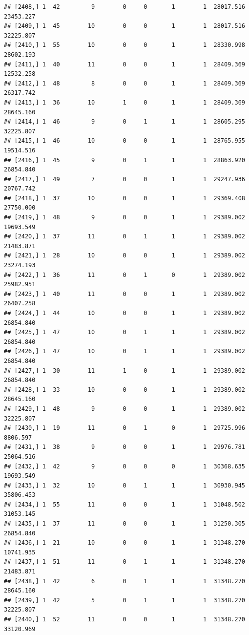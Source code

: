 \documentclass[
]{article}
\begin{document}
\begin{verbatim}
## [2408,] 1  42         9        0     0       1        1  28017.516  23453.227
## [2409,] 1  45        10        0     0       1        1  28017.516  32225.807
## [2410,] 1  55        10        0     0       1        1  28330.998  28602.193
## [2411,] 1  40        11        0     0       1        1  28409.369  12532.258
## [2412,] 1  48         8        0     0       1        1  28409.369  26317.742
## [2413,] 1  36        10        1     0       1        1  28409.369  28645.160
## [2414,] 1  46         9        0     1       1        1  28605.295  32225.807
## [2415,] 1  46        10        0     0       1        1  28765.955  19514.516
## [2416,] 1  45         9        0     1       1        1  28863.920  26854.840
## [2417,] 1  49         7        0     0       1        1  29247.936  20767.742
## [2418,] 1  37        10        0     0       1        1  29369.408  27750.000
## [2419,] 1  48         9        0     0       1        1  29389.002  19693.549
## [2420,] 1  37        11        0     1       1        1  29389.002  21483.871
## [2421,] 1  28        10        0     0       1        1  29389.002  23274.193
## [2422,] 1  36        11        0     1       0        1  29389.002  25982.951
## [2423,] 1  40        11        0     0       1        1  29389.002  26407.258
## [2424,] 1  44        10        0     0       1        1  29389.002  26854.840
## [2425,] 1  47        10        0     1       1        1  29389.002  26854.840
## [2426,] 1  47        10        0     1       1        1  29389.002  26854.840
## [2427,] 1  30        11        1     0       1        1  29389.002  26854.840
## [2428,] 1  33        10        0     0       1        1  29389.002  28645.160
## [2429,] 1  48         9        0     0       1        1  29389.002  32225.807
## [2430,] 1  19        11        0     1       0        1  29725.996   8806.597
## [2431,] 1  38         9        0     0       1        1  29976.781  25064.516
## [2432,] 1  42         9        0     0       0        1  30368.635  19693.549
## [2433,] 1  32        10        0     1       1        1  30930.945  35806.453
## [2434,] 1  55        11        0     0       1        1  31048.502  31053.145
## [2435,] 1  37        11        0     0       1        1  31250.305  26854.840
## [2436,] 1  21        10        0     0       1        1  31348.270  10741.935
## [2437,] 1  51        11        0     1       1        1  31348.270  21483.871
## [2438,] 1  42         6        0     1       1        1  31348.270  28645.160
## [2439,] 1  42         5        0     1       1        1  31348.270  32225.807
## [2440,] 1  52        11        0     0       1        1  31348.270  33120.969

\end{verbatim}
\end{document}
